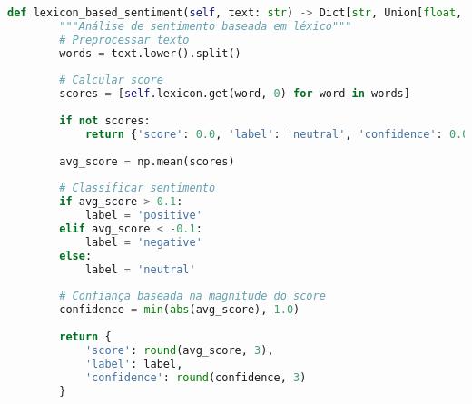 \begin{pythonbox}
\begin{lstlisting}[language=Python]   
    def lexicon_based_sentiment(self, text: str) -> Dict[str, Union[float, str]]:
        """Análise de sentimento baseada em léxico"""
        # Preprocessar texto
        words = text.lower().split()
        
        # Calcular score
        scores = [self.lexicon.get(word, 0) for word in words]
        
        if not scores:
            return {'score': 0.0, 'label': 'neutral', 'confidence': 0.0}
            
        avg_score = np.mean(scores)
        
        # Classificar sentimento
        if avg_score > 0.1:
            label = 'positive'
        elif avg_score < -0.1:
            label = 'negative'
        else:
            label = 'neutral'
            
        # Confiança baseada na magnitude do score
        confidence = min(abs(avg_score), 1.0)
        
        return {
            'score': round(avg_score, 3),
            'label': label,
            'confidence': round(confidence, 3)
        }
\end{lstlisting}
\end{pythonbox}

\newpage

